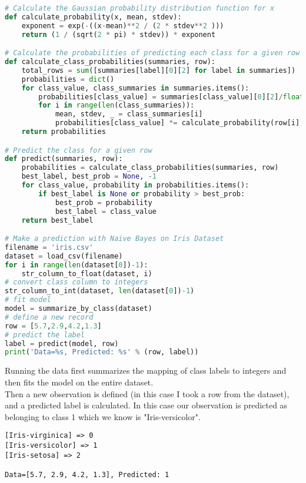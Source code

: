 \documentclass[12pt]{article}
\begin{document}
\begin{lstlisting}[language=python]
# Calculate the Gaussian probability distribution function for x
def calculate_probability(x, mean, stdev):
	exponent = exp(-((x-mean)**2 / (2 * stdev**2 )))
	return (1 / (sqrt(2 * pi) * stdev)) * exponent

# Calculate the probabilities of predicting each class for a given row
def calculate_class_probabilities(summaries, row):
	total_rows = sum([summaries[label][0][2] for label in summaries])
	probabilities = dict()
	for class_value, class_summaries in summaries.items():
		probabilities[class_value] = summaries[class_value][0][2]/float(total_rows)
		for i in range(len(class_summaries)):
			mean, stdev, _ = class_summaries[i]
			probabilities[class_value] *= calculate_probability(row[i], mean, stdev)
	return probabilities

# Predict the class for a given row
def predict(summaries, row):
	probabilities = calculate_class_probabilities(summaries, row)
	best_label, best_prob = None, -1
	for class_value, probability in probabilities.items():
		if best_label is None or probability > best_prob:
			best_prob = probability
			best_label = class_value
	return best_label

# Make a prediction with Naive Bayes on Iris Dataset
filename = 'iris.csv'
dataset = load_csv(filename)
for i in range(len(dataset[0])-1):
	str_column_to_float(dataset, i)
# convert class column to integers
str_column_to_int(dataset, len(dataset[0])-1)
# fit model
model = summarize_by_class(dataset)
# define a new record
row = [5.7,2.9,4.2,1.3]
# predict the label
label = predict(model, row)
print('Data=%s, Predicted: %s' % (row, label))

\end{lstlisting}

Running the data first summarizes the mapping of class labels to integers and then fits the model on the entire dataset.\\

Then a new observation is defined (in this case I took a row from the dataset), and a predicted label is calculated. In this case our observation is predicted as belonging to class 1 which we know is "Iris-versicolor".\\

\begin{lstlisting}
[Iris-virginica] => 0
[Iris-versicolor] => 1
[Iris-setosa] => 2

Data=[5.7, 2.9, 4.2, 1.3], Predicted: 1

\end{lstlisting}
\end{document}
